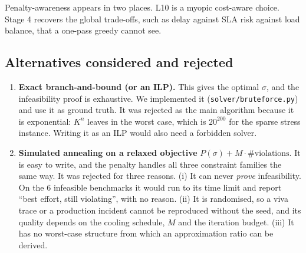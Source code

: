 Penalty-awareness appears in two places. L10 is a myopic cost-aware
choice. Stage 4 recovers the global trade-offs, such as delay against SLA
risk against load balance, that a one-pass greedy cannot see.

\subsection{Alternatives considered and rejected}
\begin{enumerate}
\item \textbf{Exact branch-and-bound (or an ILP).} This gives the optimal
  $\sigma$, and the infeasibility proof is exhaustive. We implemented it
  (\texttt{solver/bruteforce.py}) and use it as ground truth. It was
  rejected as the main algorithm because it is exponential: $K^n$ leaves in
  the worst case, which is $20^{200}$ for the sparse stress instance.
  Writing it as an ILP would also need a forbidden solver.
\item \textbf{Simulated annealing on a relaxed objective} $P(\sigma) + M
  \cdot \#\text{violations}$. It is easy to write, and the penalty handles
  all three constraint families the same way. It was rejected for three
  reasons. (i) It can never \emph{prove} infeasibility. On the 6 infeasible
  benchmarks it would run to its time limit and report ``best effort, still
  violating'', with no reason. (ii) It is randomised, so a viva trace or a
  production incident cannot be reproduced without the seed, and its
  quality depends on the cooling schedule, $M$ and the iteration budget.
  (iii) It has no worst-case structure from which an approximation ratio
  can be derived.
\end{enumerate}

